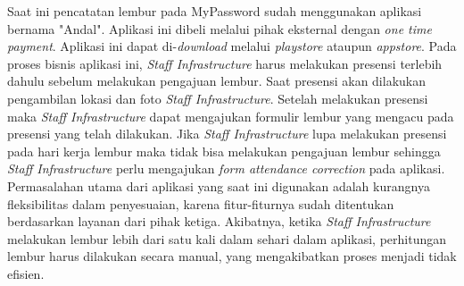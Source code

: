 Saat ini pencatatan lembur pada MyPassword sudah menggunakan aplikasi bernama "Andal". Aplikasi ini dibeli melalui pihak eksternal dengan \textit{one time payment}. Aplikasi ini dapat di-\textit{download} melalui \textit{playstore} ataupun \textit{appstore}. Pada proses bisnis aplikasi ini, \textit{Staff Infrastructure} harus melakukan presensi terlebih dahulu sebelum melakukan pengajuan lembur. Saat presensi akan dilakukan pengambilan lokasi dan foto \textit{Staff Infrastructure}. Setelah melakukan presensi maka \textit{Staff Infrastructure} dapat mengajukan formulir lembur yang mengacu pada presensi yang telah dilakukan. Jika \textit{Staff Infrastructure} lupa melakukan presensi pada hari kerja lembur maka tidak bisa melakukan pengajuan lembur sehingga \textit{Staff Infrastructure} perlu mengajukan \textit{form attendance correction} pada aplikasi. Permasalahan utama dari aplikasi yang saat ini digunakan adalah kurangnya fleksibilitas dalam penyesuaian, karena fitur-fiturnya sudah ditentukan berdasarkan layanan dari pihak ketiga. Akibatnya, ketika \textit{Staff Infrastructure} melakukan lembur lebih dari satu kali dalam sehari dalam aplikasi, perhitungan lembur harus dilakukan secara manual, yang mengakibatkan proses menjadi tidak efisien.






